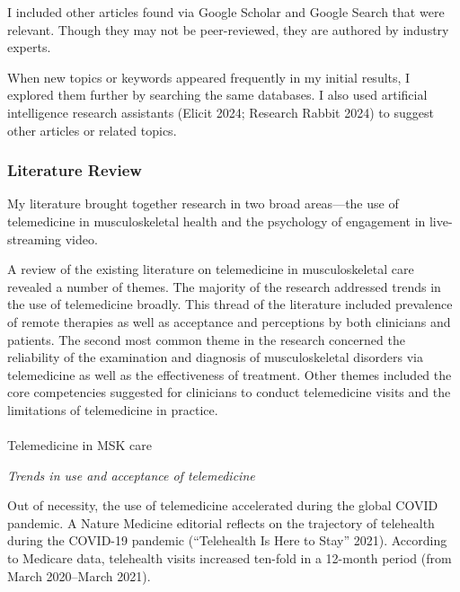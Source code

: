 \documentclass[
  letterpaper,
  DIV=11,
  numbers=noendperiod,
  oneside]{scrartcl}
\makeatletter
\let\oldparagraph\paragraph
\renewcommand{\paragraph}{
    \@ifstar
      \xxxParagraphStar
      \xxxParagraphNoStar
  }
\newcommand{\xxxParagraphStar}[1]{\oldparagraph*{#1}\mbox{}}
\newcommand{\xxxParagraphNoStar}[1]{\oldparagraph{#1}\mbox{}}
\makeatother
\begin{document}
I included other articles found via Google Scholar and Google Search
that were relevant. Though they may not be peer-reviewed, they are
authored by industry experts.

When new topics or keywords appeared frequently in my initial results, I
explored them further by searching the same databases. I also used
artificial intelligence research assistants (Elicit 2024; Research
Rabbit 2024) to suggest other articles or related topics.

\subsubsection{Literature Review}\label{literature-review}

My literature brought together research in two broad areas---the use of
telemedicine in musculoskeletal health and the psychology of engagement
in live-streaming video.

A review of the existing literature on telemedicine in musculoskeletal
care revealed a number of themes. The majority of the research addressed
trends in the use of telemedicine broadly. This thread of the literature
included prevalence of remote therapies as well as acceptance and
perceptions by both clinicians and patients. The second most common
theme in the research concerned the reliability of the examination and
diagnosis of musculoskeletal disorders via telemedicine as well as the
effectiveness of treatment. Other themes included the core competencies
suggested for clinicians to conduct telemedicine visits and the
limitations of telemedicine in practice.

\paragraph{Telemedicine in MSK care}\label{telemedicine-in-msk-care}

\emph{Trends in use and acceptance of telemedicine}

Out of necessity, the use of telemedicine accelerated during the global
COVID pandemic. A Nature Medicine editorial reflects on the trajectory
of telehealth during the COVID-19 pandemic ({``Telehealth Is Here to
Stay''} 2021). According to Medicare data, telehealth visits increased
ten-fold in a 12-month period (from March 2020--March 2021).
\end{document}
